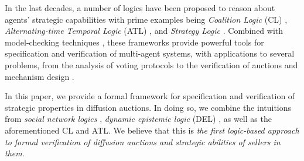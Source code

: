 \documentclass[letterpaper]{article} %
\theoremstyle{definition}
\newcommand{\munyque}[1]{{[\color{red}#1]}}
\newcommand{\laurent}[1]{{[\color{purple}#1]}}
\begin{document}
In the last decades, a number of logics have been proposed to reason about agents' %
strategic capabilities with prime examples being %
\textit{Coalition Logic} (CL) \cite{pauly02},   \textit{Alternating-time Temporal Logic} (ATL) \cite{alur2002}, and \textit{Strategy Logic}  \cite{MogaveroMPV14}.
Combined with model-checking techniques \cite{clarke2018handbook}, these frameworks provide powerful tools for specification and verification of multi-agent systems, with applications to several problems, from   %
the %
analysis of voting protocols \cite{BelardinelliCDJ21,JamrogaKM22} to the verification of auctions and  mechanism design \cite{MittelmannAIJ2025,MittelmannMMP23}.

In this paper, we provide a formal framework for specification and verification of strategic properties in diffusion auctions. In doing so, we combine the intuitions from \textit{social network logics} \cite{minathesis}, \textit{dynamic epistemic logic} (DEL) \cite{hvdetal.del:2007}, as well as the aforementioned CL and ATL.  We believe that this is \textit{the first logic-based approach to formal verification of diffusion auctions and strategic abilities of sellers in them}.  

\end{document}
